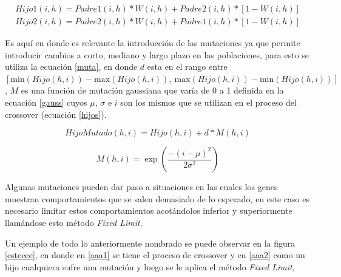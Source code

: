 \documentclass[12pt]{article}
\begin{document}
\begin{align}
Hijo1(i,h) = Padre1(i,h)*W(i,h)+Padre2(i,h)*\left[1-W(i,h)\right]  \nonumber \\
Hijo2(i,h) = Padre2(i,h)*W(i,h)+Padre1(i,h)*\left[1-W(i,h)\right]
\label{hijos}
\end{align}

Es aquí en donde es relevante la introducción de las mutaciones ya que permite introducir cambios a corto, mediano y largo plazo en las poblaciones, para esto se utiliza la ecuación \eqref{muta}, en donde $d$ esta en el rango entre $[\mathrm{min}(Hijo(h,i)) - \mathrm{max}(Hijo(h,i)),\ \mathrm{max}(Hijo(h,i)) - \mathrm{min}(Hijo(h,i))]$, $M$ es una función de mutación gaussiana que varía de 0 a 1 definida en la ecuación \eqref{gauss} cuyos $\mu$, $\sigma$ e $i$ son los mismos que se utilizan en el proceso del crossover (ecuación \eqref{hijos}).

\begin{equation}
HijoMutado(h,i) = Hijo(h,i)+d*M(h,i)
\label{muta}
\end{equation}

\begin{equation}
M(h,i)=\exp\left(\frac{-(i-\mu)^{2}}{2\sigma^{2}}\right)
\label{gauss}
\end{equation}

Algunas mutaciones pueden dar paso a situaciones en las cuales los genes muestran comportamientos que se salen demasiado de lo esperado, en este caso es necesario limitar estos comportamientos acotándolos inferior y superiormente llamándose esto método \textit{Fixed Limit}.

Un ejemplo de todo lo anteriormente nombrado se puede observar en la figura \ref{esteeee}, en donde en \ref{aaa1} se tiene el proceso de crossover y en \ref{aaa2} como un hijo cualquiera sufre una mutación y luego se le aplica el método \textit{Fixed Limit},
\end{document}
